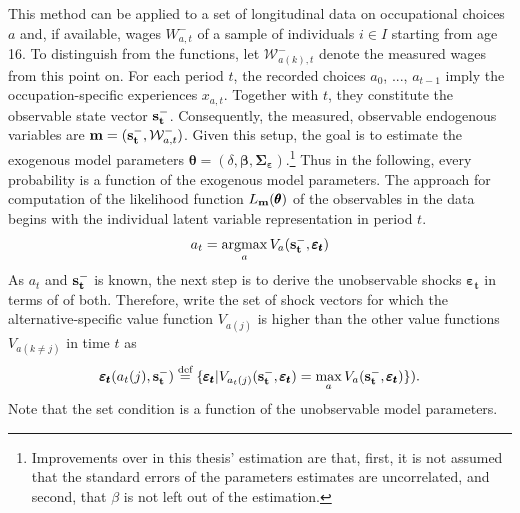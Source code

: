 This method can be applied to a set of longitudinal data on occupational choices $a$ and, if available, wages $W_{a,t}^{-}$ of a sample of individuals $i \in I$ starting from age 16. To distinguish from the functions, let $\mathcal{W}^{-}_{a(k),t}$ denote the measured wages from this point on. For each period $t$, the recorded choices $a_0$, ..., $a_{t-1}$  imply the occupation-specific experiences $x_{a,t}$. Together with $t$, they constitute the observable state vector $\bold{s_t^-}$. Consequently, the measured, observable endogenous variables are $\bold{m}=(\bold{s_t^-},\mathcal{W}^{-}_{a,t})$. Given this setup, the goal is to estimate the exogenous model parameters $\pmb{\theta}=(\delta, \pmb{\beta}, \pmb{\Sigma_\varepsilon})$.\footnote{Improvements over \cite{Keane.1994} in this thesis' estimation are that, first, it is not assumed that the standard errors of the parameters estimates are uncorrelated, and second, that $\beta$ is not left out of the estimation.} Thus in the following, every probability is a function of the exogenous model parameters.
The approach for computation of the likelihood function $L_{\bold{m}}(\pmb{\theta})$ of the observables in the data begins with the individual latent variable representation in period $t$.
\begin{align}
a_t = \operatorname*{argmax}_a V_a(\bold{s_t^-},\pmb{\varepsilon_t})
\end{align}
As $a_t$ and $\bold{s_t^-}$ is known, the next step is to derive the unobservable shocks $\pmb{\varepsilon_t}$ in terms of of both. Therefore, write the set of shock vectors for which the alternative-specific value function $V_{a(j)}$ is higher than the other value functions $V_{a(k\neq j)}$ in time $t$ as
\begin{align}
\pmb{\varepsilon_t}(a_t(j),\bold{s_t^-}) \stackrel{\text{def}}{=} \{\pmb{\varepsilon_t}|V_{a_t(j)}(\bold{s_t^-},\pmb{\varepsilon_t}) = \max_a V_a(\bold{s_t^-},\pmb{\varepsilon_t})\}).
\end{align}
Note that the set condition is a function of the unobservable model parameters.

